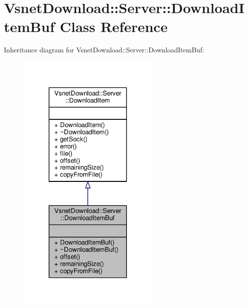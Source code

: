 \hypertarget{classVsnetDownload_1_1Server_1_1DownloadItemBuf}{}\section{Vsnet\+Download\+:\+:Server\+:\+:Download\+Item\+Buf Class Reference}
\label{classVsnetDownload_1_1Server_1_1DownloadItemBuf}


Inheritance diagram for Vsnet\+Download\+:\+:Server\+:\+:Download\+Item\+Buf\+:
\nopagebreak
\begin{figure}[H]
\begin{center}
\leavevmode
\includegraphics[width=200pt]{da/dab/classVsnetDownload_1_1Server_1_1DownloadItemBuf__inherit__graph}
\end{center}
\end{figure}


